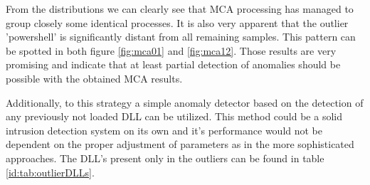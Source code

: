 \documentclass[a4paper,twoside,12pt]{book}
\begin{document}
From the distributions we can clearly see that MCA processing has managed to group closely some
identical processes. It is also very apparent that the outlier 'powershell' is significantly distant from all remaining samples. 
This pattern can be spotted in both figure \ref{fig:mca01} and \ref{fig:mca12}. Those results are very 
promising and indicate that at least partial detection of anomalies should be possible with the obtained MCA results.

Additionally, to this strategy a simple anomaly detector based on the detection of any previously not loaded
DLL can be utilized. This method could be a solid intrusion detection system on its own and it's performance
would not be dependent on the proper adjustment of parameters as in the more sophisticated approaches. The 
DLL's present only in the outliers can be found in table \ref{id:tab:outlierDLLs}.
\end{document}
